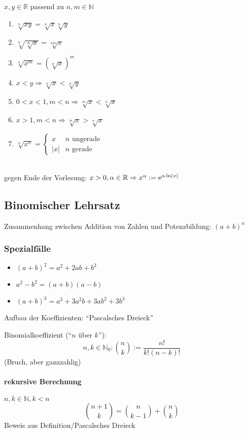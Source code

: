 $x,y \in \mathbb{R}$ passend zu $n,m \in\mathbb{N}$
\begin{enumerate}
 \item $\sqrt[n]{xy} = \sqrt[n]x \sqrt[n]y$
 \item $\sqrt[n]{\sqrt[m]x} = \sqrt[nm]x$
 \item $\sqrt[n]{x^m} = (\sqrt[n]x)^m$
 \item $x<y \Rightarrow \sqrt[n]x < \sqrt[n]y$
 \item $0<x<1, m<n \Rightarrow \sqrt[m]{x} < \sqrt[n]{x}$
 \item $x>1, m<n \Rightarrow \sqrt[m]x > \sqrt[n]x$
 \item $\sqrt[n]{x^n} = \begin{cases} x & n \text{ ungerade} \\ |x| & n \text{ gerade} \end{cases}$
\end{enumerate}
\induction\\
gegen Ende der Vorlesung: $x > 0, \alpha \in \mathbb{R} \Rightarrow x^\alpha := \operatorname{e}^{\alpha \operatorname{ln}(x)}$

\subsection{Binomischer Lehrsatz}

Zusammenhang zwischen Addition von Zahlen und Potenzbildung: $(a+b)^n$

\subsubsection*{Spezialfälle}

\begin{itemize}
 \item $(a+b)^2 = a^2+2ab+b^2$
 \item $a^2-b^2 = (a+b)(a-b)$
 \item $(a+b)^3=a^3+3a^2b+3ab^2+3b^3$
\end{itemize}
%
Aufbau der Koeffizienten: ``Pascalsches Dreieck''

\begin{definition} Binomialkoeffizient (``$n$ über $k$''):
 \begin{equation*} n,k \in \mathbb{N}_0: {n \choose k} := \frac{n!}{k!(n-k)!}\end{equation*}
 (Bruch, aber ganzzahlig)
\end{definition}

\paragraph{rekursive Berechnung} $n,k \in \mathbb{N}, k < n$
\begin{equation*} {n+1 \choose k} = {n \choose k-1} + {n \choose k} \end{equation*}
%
Beweis aus Definition/Pascalsches Dreieck

